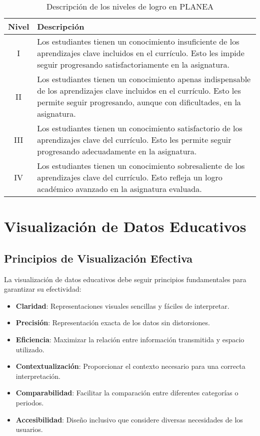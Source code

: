 \begin{table}[h]
\centering
\begin{tabular}{|c|p{12cm}|}
\hline
\textbf{Nivel} & \textbf{Descripción} \\
\hline
I & Los estudiantes tienen un conocimiento insuficiente de los aprendizajes clave incluidos en el currículo. Esto les impide seguir progresando satisfactoriamente en la asignatura. \\
\hline
II & Los estudiantes tienen un conocimiento apenas indispensable de los aprendizajes clave incluidos en el currículo. Esto les permite seguir progresando, aunque con dificultades, en la asignatura. \\
\hline
III & Los estudiantes tienen un conocimiento satisfactorio de los aprendizajes clave del currículo. Esto les permite seguir progresando adecuadamente en la asignatura. \\
\hline
IV & Los estudiantes tienen un conocimiento sobresaliente de los aprendizajes clave del currículo. Esto refleja un logro académico avanzado en la asignatura evaluada. \\
\hline
\end{tabular}
\caption{Descripción de los niveles de logro en PLANEA}
\label{tabla:niveles}
\end{table}

\section{Visualización de Datos Educativos}

\subsection{Principios de Visualización Efectiva}
La visualización de datos educativos debe seguir principios fundamentales para garantizar su efectividad:

\begin{itemize}
    \item \textbf{Claridad}: Representaciones visuales sencillas y fáciles de interpretar.
    \item \textbf{Precisión}: Representación exacta de los datos sin distorsiones.
    \item \textbf{Eficiencia}: Maximizar la relación entre información transmitida y espacio utilizado.
    \item \textbf{Contextualización}: Proporcionar el contexto necesario para una correcta interpretación.
    \item \textbf{Comparabilidad}: Facilitar la comparación entre diferentes categorías o periodos.
    \item \textbf{Accesibilidad}: Diseño inclusivo que considere diversas necesidades de los usuarios.
\end{itemize}

